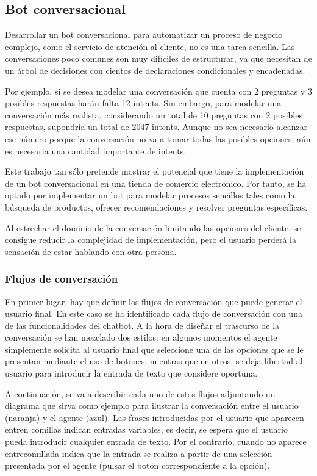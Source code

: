 \newpage

\subsection{Bot conversacional}

Desarrollar un bot conversacional para automatizar un proceso de negocio complejo, como el servicio de atención al cliente, no es una tarea sencilla. Las conversaciones poco comunes son muy difíciles de estructurar, ya que necesitan de un árbol de decisiones con cientos de declaraciones condicionales y encadenadas.

Por ejemplo, si se desea modelar una conversación que cuenta con 2 preguntas y 3 posibles respuestas harán falta 12 intents. Sin embargo, para modelar una conversación más realista, considerando un total de 10 preguntas con 2 posibles respuestas, supondría un total de 2047 intents. Aunque no sea necesario alcanzar ese número porque la conversación no va a tomar todas las posibles opciones, aún es necesaria una cantidad importante de intents.

Este trabajo tan sólo pretende mostrar el potencial que tiene la implementación de un bot conversacional en una tienda de comercio electrónico. Por tanto, se ha optado por implementar un bot para modelar procesos sencillos tales como la búsqueda de productos, ofrecer recomendaciones y resolver preguntas específicas. 

Al estrechar el dominio de la conversación limitando las opciones del cliente, se consigue reducir la complejidad de implementación, pero el usuario perderá la sensación de estar hablando con otra persona.

\subsubsection{Flujos de conversación}

En primer lugar, hay que definir los flujos de conversación que puede generar el usuario final. En este caso se ha identificado cada flujo de conversación con una de las funcionalidades del chatbot. A la hora de diseñar el trascurso de la conversación se han mezclado dos estilos: en algunos momentos el agente simplemente solicita al usuario final que seleccione una de las opciones que se le presentan mediante el uso de botones, mientras que en otros, se deja libertad al usuario para introducir la entrada de texto que considere oportuna.

A continuación, se va a describir cada uno de estos flujos adjuntando un diagrama que sirva como ejemplo para ilustrar la conversación entre el usuario (naranja) y el agente (azul). Las frases introducidas por el usuario que aparecen entren comillas indican entradas variables, es decir, se espera que el usuario pueda introducir cualquier entrada de texto. Por el contrario, cuando no aparece entrecomillada indica que la entrada se realiza a partir de una selección presentada por el agente (pulsar el botón correspondiente a la opción).

